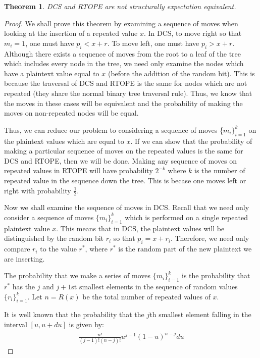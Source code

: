 \documentclass[12pt]{article}
\newtheorem{theorem}{Theorem}[section]
\begin{document}
  \begin{theorem}
    DCS and RTOPE are not structurally expectation equivalent.
  \end{theorem}
  \begin{proof}
    We shall prove this theorem by examining a sequence of moves when looking at the insertion of a repeated value $x$. In DCS, to move right so that $m_i = 1$, one must have $p_i < x + r$. To move left, one must have $p_i > x + r$. Although there exists a sequence of moves from the root to a leaf of the tree which includes every node in the tree, we need only examine the nodes which have a plaintext value equal to $x$ (before the addition of the random bit). This is because the traversal of DCS and RTOPE is the same for nodes which are not repeated (they share the normal binary tree traversal rule). Thus, we know that the moves in these cases will be equivalent and the probability of making the moves on non-repeated nodes will be equal.

    Thus, we can reduce our problem to considering a sequence of moves \{$m_i\}_{i=1}^k$ on the plaintext values which are equal to $x$. If we can show that the probability of making a particular sequence of moves on the repeated values is the same for DCS and RTOPE, then we will be done. Making any sequence of moves on repeated values in RTOPE will have probability $2^{-k}$ where $k$ is the number of repeated value in the sequence down the tree. This is becase one moves left or right with probability $\frac{1}{2}$.

    Now we shall examine the sequence of moves in DCS. Recall that we need only consider a sequence of moves $\{m_i\}_{i=1}^k$ which is performed on a single repeated plaintext value $x$. This means that in DCS, the plaintext values will be distinguished by the random bit $r_i$ so that $p_i = x + r_i$. Therefore, we need only compare $r_i$ to the value $r^*$, where $r^*$ is the random part of the new plaintext we are inserting.

    The probability that we make a series of moves $\{m_i\}_{i=1}^k$ is the probability that $r^*$ has the $j$ and $j+1$st smallest elements in the sequence of random values $\{ r_i\}_{i=1}^k$. Let $n = R(x)$ be the total number of repeated values of $x$.

    It is well known that the probability that the $j$th smallest element falling in the interval $[u, u + du]$ is given by:
    \begin{eqnarray}
      \frac{n!}{(j-1)!(n-j)!} u^{j-1} (1-u)^{n-j} du
    \end{eqnarray}


\end{proof}
\end{document}

